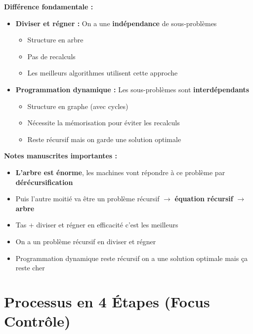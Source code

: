 \documentclass[12pt,a4paper]{article}
\begin{document}
\begin{important}
\textbf{Différence fondamentale :}

\begin{itemize}
    \item \textbf{Diviser et régner :} On a une \textcolor{defvert}{\textbf{indépendance}} de sous-problèmes
    \begin{itemize}
        \item Structure en arbre
        \item Pas de recalculs
        \item Les meilleurs algorithmes utilisent cette approche
    \end{itemize}
    
    \item \textbf{Programmation dynamique :} Les sous-problèmes sont \textcolor{importantrouge}{\textbf{interdépendants}}
    \begin{itemize}
        \item Structure en graphe (avec cycles)
        \item Nécessite la mémorisation pour éviter les recalculs
        \item Reste récursif mais on garde une solution optimale
    \end{itemize}
\end{itemize}
\end{important}

\begin{notecours}
\textbf{Notes manuscrites importantes :}
\begin{itemize}
    \item \textbf{L'arbre est énorme}, les machines vont répondre à ce problème par \textbf{dérécursification}
    \item Puis l'autre moitié va être un problème récursif $\rightarrow$ \textbf{équation récursif} $\rightarrow$ \textbf{arbre}
    \item Tas + diviser et régner en efficacité c'est les meilleurs
    \item On a un problème récursif en diviser et régner
    \item Programmation dynamique reste récursif on a une solution optimale mais ça reste cher
\end{itemize}
\end{notecours}

\newpage
\section{Processus en 4 Étapes (Focus Contrôle)}
\end{document}
